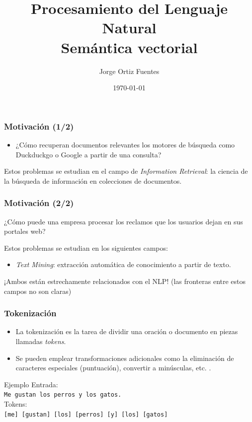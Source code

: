 \documentclass[handout]{beamer}
\title{Procesamiento del Lenguaje Natural \\ Semántica vectorial}
\author[Jorge Ortiz Fuentes]{Jorge Ortiz Fuentes}
\date{\today}
\begin{document}
\begin{frame}
\titlepage
\end{frame}

\begin{frame}\frametitle{Motivación (1/2)}

  \begin{itemize}
   \item ¿Cómo recuperan documentos relevantes los motores de búsqueda como Duckduckgo o Google a partir de una consulta?
  \end{itemize}

Estos problemas se estudian en el campo de \emph{Information Retrieval}: la ciencia de la búsqueda de información en colecciones de documentos.

\end{frame}

\begin{frame}\frametitle{Motivación (2/2)}

¿Cómo puede una empresa procesar los reclamos que los usuarios dejan en sus portales web?

Estos problemas se estudian en los siguientes campos:

\begin{itemize}
 \item \emph{Text Mining}: extracción automática de conocimiento a partir de texto.
\end{itemize}

¡Ambos están estrechamente relacionados con el NLP! (las fronteras entre estos campos no son claras)

\end{frame}

\begin{frame}\frametitle{Tokenización}
  \begin{itemize}
   \item La tokenización es la tarea de dividir una oración o documento en piezas llamadas \emph{tokens}.
   \item Se pueden emplear transformaciones adicionales como la eliminación de caracteres especiales (puntuación), convertir a minúsculas, etc. \cite{manning2008}.
  \end{itemize}
  
  \begin{block}{Ejemplo}
    \centering
    \vspace{0.5em}
    Entrada:\\ 
    \texttt{Me gustan los perros y los gatos.}\\
    \vspace{0.5em}
    Tokens:\\
    \texttt{[me] [gustan] [los] [perros] [y] [los] [gatos]}
  \end{block}
  \end{frame}
\end{document}

